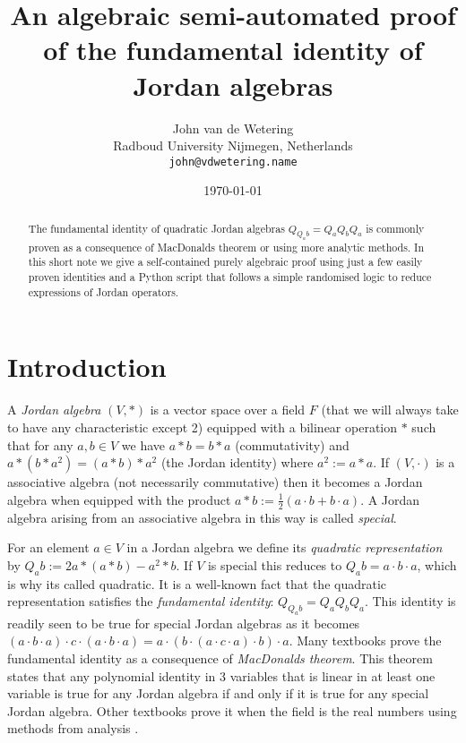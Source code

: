 \documentclass{article}
\begin{document}
\title{An algebraic semi-automated proof of the fundamental identity of Jordan algebras}
\author{John van de Wetering \\
       Radboud University Nijmegen, Netherlands\\
       \texttt{john@vdwetering.name}}
\date{\today}
\maketitle

\begin{abstract}
    The fundamental identity of quadratic Jordan algebras $Q_{Q_a b} = Q_aQ_bQ_a$ is commonly proven as a consequence of MacDonalds theorem or using more analytic methods. In this short note we give a self-contained purely algebraic proof using just a few easily proven identities and a Python script that follows a simple randomised logic to reduce expressions of Jordan operators.
\end{abstract}

\section{Introduction}
A \emph{Jordan algebra} $(V,*)$ is a vector space over a field $F$ (that we will always take to have any characteristic except 2) equipped with a bilinear operation $*$ such that for any $a,b\in V$ we have $a*b = b*a$ (commutativity) and $a*(b*a^2) = (a*b)*a^2$ (the Jordan identity) where $a^2:= a*a$. If $(V,\cdot)$ is a associative algebra (not necessarily commutative) then it becomes a Jordan algebra when equipped with the product $a*b:= \frac{1}{2}(a\cdot b + b\cdot a)$. A Jordan algebra arising from an associative algebra in this way is called \emph{special}.

For an element $a\in V$ in a Jordan algebra we define its \emph{quadratic representation} by $Q_a b:= 2a*(a*b) - a^2*b$. If $V$ is special this reduces to $Q_a b = a\cdot b\cdot a$, which is why its called quadratic. It is a well-known fact that the quadratic representation satisfies the \emph{fundamental identity}: $Q_{Q_a b} = Q_aQ_bQ_a$. This identity is readily seen to be true for special Jordan algebras as it becomes $(a\cdot b\cdot a)\cdot c \cdot (a\cdot b\cdot a) = a\cdot (b\cdot(a\cdot c\cdot a)\cdot b)\cdot a$. Many textbooks \cite{hanche1984jordan,alfsen2012geometry,chu2011jordan,mccrimmon2006taste} prove the fundamental identity as a consequence of \emph{MacDonalds theorem}. This theorem states that any polynomial identity in 3 variables that is linear in at least one variable is true for any Jordan algebra if and only if it is true for any special Jordan algebra. Other textbooks prove it when the field is the real numbers using methods from analysis \cite{faraut1994analysis}.
\end{document}

